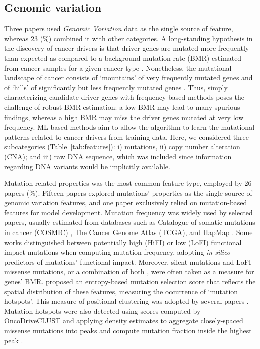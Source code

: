 \subsection{Genomic variation}

Three papers \cite{LI2016, Han2019, Xi2019} used \textit{Genomic Variation} data as the single source of feature, whereas 23 (\%) combined it with other categories. A long-standing hypothesis in the discovery of cancer drivers is that driver genes are mutated more frequently than expected as compared to a background mutation rate (BMR) estimated from cancer samples for a given cancer type \cite{tamborero2013comprehensive}. Nonetheless, the mutational landscape of cancer consists of `mountains' of very frequently mutated genes and of `hills' of significantly but less frequently mutated genes \cite{vogelstein2013cancer}. Thus, simply characterizing candidate driver genes with frequency-based methods poses the challenge of robust BMR estimation: a low BMR may lead to many spurious findings, whereas a high BMR may miss the driver genes mutated at very low frequency. ML-based methods aim to allow the algorithm to learn the mutational patterns related to cancer drivers from training data. 
Here, we considered three subcategories (Table~\ref{tab:features}): i) mutations, 
ii) copy number alteration (CNA); 
and iii) raw DNA sequence, which was included since information regarding DNA variants would be implicitly available.

Mutation-related properties was the most common feature type, employed by 26 papers (\%). Fifteen papers explored mutations' properties as the single source of genomic variation features, and one paper \cite{Han2019} exclusively relied on mutation-based features for model development. Mutation frequency was widely used by selected papers, usually estimated from databases such as Catalogue of somatic mutations in cancer (COSMIC)  \cite{cosmic}, The Cancer Genome Atlas (TCGA), and HapMap \cite{hapmap}. Some works \cite{Davoli2013, Gnad2015, Lyu2020} distinguished between potentially high (HiFI) or low (LoFI) functional impact mutations when computing mutation frequency, adopting \textit{in silico} predictors 
of mutations' functional impact. Moreover, silent mutations and LoFI missense mutations, or a combination of both \cite{Gnad2015,Lyu2020}, were often taken as a measure for genes' BMR. 
\citet{Davoli2013} proposed an entropy-based mutation selection score that reflects the spatial distribution of these features, measuring the occurrence of `mutation hotspots'. This measure of positional clustering was adopted by several papers \cite{Gnad2015, Tokheim2016, Collier2019, Luo2019, Colaprico2020, Nulsen2021}. Mutation hotspots were also detected using scores computed by OncoDriveCLUST \cite{tamborero2013oncodriveclust, Schroeder2014, Nulsen2021} and applying density estimates to aggregate closely-spaced missense mutations into peaks and compute mutation fraction inside the highest peak \cite{Chandrashekar2020}.

